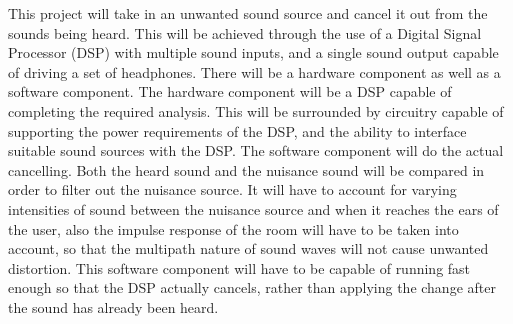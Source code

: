 \label{goals}
This project will take in an unwanted sound source and cancel it out from the sounds being heard. This will be achieved through the use of a Digital Signal Processor (DSP) with multiple sound inputs, and a single sound output capable of driving a set of headphones.
There will be a hardware component as well as a software component. The hardware component will be a DSP capable of completing the required analysis. This will be surrounded by circuitry capable of supporting the power requirements of the DSP, and the ability to interface suitable sound sources with the DSP.
The software component will do the actual cancelling. Both the heard sound and the nuisance sound will be compared in order to filter out the nuisance source. It will have to account for varying intensities of sound between the nuisance source and when it reaches the ears of the user, also the impulse response of the room will have to be taken into account, so that the multipath nature of sound waves will not cause unwanted distortion. This software component will have to be capable of running fast enough so that the DSP actually cancels, rather than applying the change after the sound has already been heard.
